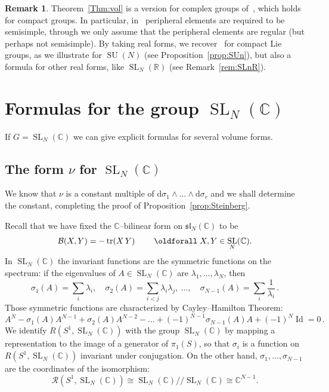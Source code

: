 \documentclass[11pt]{article}
\theoremstyle{definition}
\newtheorem{rema}[theo]{Remark}
\numberwithin{equation}{section}
\numberwithin{figure}{section}
\numberwithin{table}{section}
\DeclareMathOperator{\SL}{SL}
\DeclareMathOperator{\SU}{SU}
\DeclareMathOperator{\Id}{Id}
\DeclareMathOperator{\tr}{tr}
\newcommand{\Bcal}{\mathcal{B}}
\newcommand{\Rcal}{\mathcal{R}}
\newcommand{\Cbb}{\mathbb{C}}
\newcommand{\Rbb}{\mathbb {R}}
\newcommand{\slfrk}{\mathfrak{sl}}
\newcommand*{\dd}{\mathrm{d}}
\newcommand{\SUn}{\SU(N)}
\renewcommand*{\forall}{\mathrel{\oldforall}}
\begin{document}
\begin{rema}\label{rem:BL}
Theorem~\ref{Thm:vol} is a version for complex groups of~\cite[Theorem~5.40]{BL}, which holds for compact groups. In particular, in~\cite[Definition~5.38]{BL} peripheral elements are required to be semisimple, through we only assume that the peripheral elements are regular (but perhaps not semisimple). By taking real forms, we recover~\cite[Theorem~5.40]{BL} for compact Lie groups, as we illustrate for $\SUn$ (see Proposition~\ref{prop:SUn}), but also a formula for other real forms, like $\SL_N(\Rbb)$ (see Remark~\ref{rem:SLnR}).
\end{rema}

\section{Formulas for the group \texorpdfstring{$\SL_N (\Cbb)$}{SLn}}\label{Section:SLn}

If $G=\SL_N (\Cbb)$ we can give explicit formulas for several volume forms.


\subsection{The form \texorpdfstring{$\nu$}{nu} for \texorpdfstring{$\SL_N (\Cbb)$}{SLn}}


We know that $\nu$ is a constant multiple of $\dd\sigma_1\wedge\dots \wedge \dd\sigma_r$ and we shall determine the constant, completing the proof of Proposition~\ref{prop:Steinberg}.

Recall that we have fixed the $\Cbb$--bilinear form on $\slfrk_N (\Cbb)$ to be
\[
\Bcal (X,Y)=-\tr(X\, Y) \qquad \forall X,Y\in\SL_N (\Cbb).
\]
In $\SL_N (\Cbb)$ the invariant functions are the symmetric functions on the spectrum: if the eigenvalues of $A\in\SL_N (\Cbb)$ are $\lambda_1,\dots,\lambda_N$, then
\begin{equation*}
\sigma_1(A) = \sum_i\lambda_i, \quad
\sigma_2(A) = \sum_{i<j}\lambda_i\lambda_j, \ \dots, \quad
\sigma_{N-1}(A) =\sum_i \frac{1}{\lambda_i} \,.
\end{equation*}
Those symmetric functions are characterized by Cayley--Hamilton Theorem:
\[
A^N-\sigma_1(A) A^{N-1}+ \sigma_2(A) A^{N-2}-\dots +(-1)^{N-1}\sigma_{N-1}(A) A+ (-1)^N\Id=0
\,.
\]
We identify $R(S^1,\SL_N (\Cbb))$ with the group $\SL_N (\Cbb)$ by mapping a representation to the image of a generator of $\pi_1(S)$, so that $\sigma_i$ is a function on $R(S^1,\SL_N (\Cbb))$ invariant under conjugation. On the other hand, $\sigma_1,\dots,
\sigma_{N-1}$ are the coordinates of the isomorphism:
\[
\Rcal(S^1, \SL_N (\Cbb))\cong \SL_N (\Cbb)/\! /\SL_N (\Cbb) \cong\Cbb^{N-1}.
\]
\end{document}
